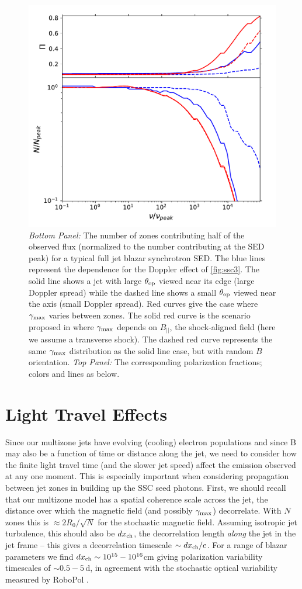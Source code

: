 \begin{figure}[t]
\includegraphics[width=0.6\linewidth]{figures/Figure5.pdf}
\centering
\caption{\textit{Bottom Panel:} The number of zones contributing half of the observed flux (normalized to the number contributing at the  SED peak) for a typical full jet blazar synchrotron SED. The blue lines represent the dependence for the Doppler effect of \cref{fig:ssc3}. The solid line shows a jet with large $\theta_{\rm op}$ viewed near its edge (large Doppler spread) while the dashed line shows a small $\theta_{\rm op}$ viewed near the axis (small Doppler spread). Red curves give the case where $\gamma_{\rm max}$ varies between zones. The solid red curve is the scenario proposed in \citet{marscher_turbulent_2014} where $\gamma_{\rm max}$ depends on $B_{||}$, the shock-aligned field (here we assume a transverse shock). The dashed red curve represents the same $\gamma_{\rm max}$ distribution as the solid line case, but with random $B$ orientation. \textit{Top Panel:}  The corresponding polarization fractions; colors and lines as below.}
\label{fig:ssc5}
\end{figure}

\section{Light Travel Effects}

Since our multizone jets have evolving (cooling) electron populations and since B may also be a function of time or distance along the jet, we need to consider how the finite light travel time (and the slower jet speed) affect the emission observed at any one moment. This is especially important when considering propagation between jet zones in building up the SSC seed photons. First, we should recall that our multizone model has a spatial coherence scale across the jet, the distance over which the magnetic field (and possibly $\gamma_{\rm max}$) decorrelate. With $N$ zones this is $\approx 2R_0/\sqrt{N}$ for the stochastic magnetic field. Assuming isotropic jet turbulence, this should also be $dx_{\rm ch}$, the decorrelation length {\it along} the jet in the jet frame -- this gives a decorrelation timescale $\sim dx_{\rm ch} / c$. For a range of blazar parameters we find $dx_{\rm ch} \sim 10^{15} - 10^{16}$cm giving polarization variability timescales of $\sim 0.5-5$\,d, in agreement with the stochastic optical variability measured by RoboPol \citep{liodakis_prospects_2019}.


